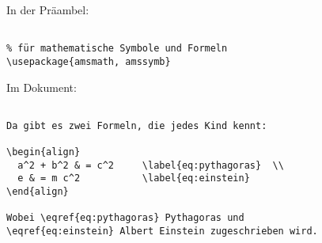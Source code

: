 
In der Präambel:

\begin{verbatim}

% für mathematische Symbole und Formeln
\usepackage{amsmath, amssymb}

\end{verbatim}

\tcblower

Im Dokument: 

\begin{verbatim}

Da gibt es zwei Formeln, die jedes Kind kennt: 

\begin{align}
  a^2 + b^2 & = c^2     \label{eq:pythagoras}  \\  
  e & = m c^2           \label{eq:einstein}  
\end{align}

Wobei \eqref{eq:pythagoras} Pythagoras und 
\eqref{eq:einstein} Albert Einstein zugeschrieben wird.

\end{verbatim}
